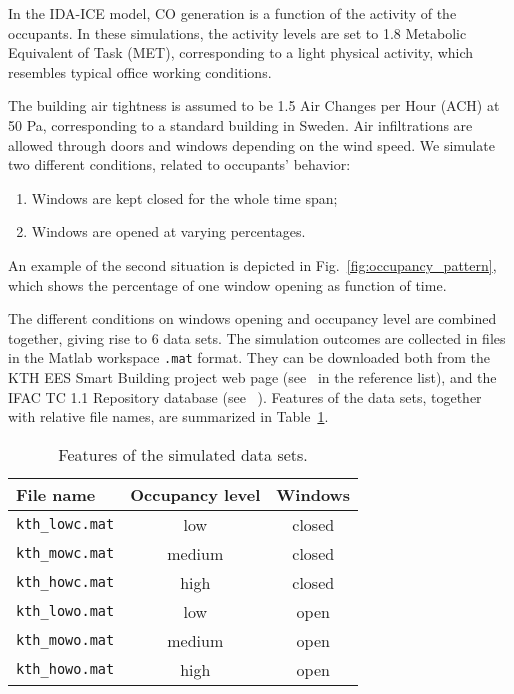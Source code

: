\documentclass{article}
\begin{document}
In the IDA-ICE model, CO generation is a function of the activity of the
occupants. In these simulations, the activity levels are set to 1.8 Metabolic
Equivalent of Task (MET), corresponding to a light physical activity, which
resembles typical office working conditions.

The building air tightness is assumed to be 1.5 Air Changes per Hour (ACH) at
50 Pa, corresponding to a standard building in Sweden. Air infiltrations
are allowed through doors and windows depending on the wind speed.
We simulate two different conditions, related to occupants' behavior:
\begin{enumerate}
\item Windows are kept closed for the whole time span;
\item Windows are opened at varying percentages.
\end{enumerate}
An example of the second situation is depicted in
Fig.~\ref{fig:occupancy_pattern}, which shows the percentage of one window
opening as function of time.

The different conditions on windows opening and occupancy level are combined
together, giving rise to 6 data sets. The simulation outcomes are collected in
files in the Matlab workspace \texttt{.mat} format. They can be downloaded both
from the KTH EES Smart Building project web page (see~\citeauthor{kth-ees2015ees}
in the reference list), and the IFAC TC 1.1 Repository database (see
~\citeauthor{ifac2015ifac}). Features of the data sets, together with
relative file names, are summarized in Table~\ref{tab:datasets}.

\begin{table}[h!]\label{tab:datasets}
\begin{center}
\begin{tabular}{lcc}
File name & Occupancy level & Windows \\
\toprule
\texttt{kth\_lowc.mat} & low	& closed \\
\texttt{kth\_mowc.mat} & medium	& closed \\
\texttt{kth\_howc.mat} & high	& closed \\
\texttt{kth\_lowo.mat} & low	& open \\
\texttt{kth\_mowo.mat} & medium	& open \\
\texttt{kth\_howo.mat} & high	& open \\
\bottomrule
\end{tabular}
\vspace{2mm}
\caption{Features of the simulated data sets.}
\end{center}
\end{table}
\end{document}

